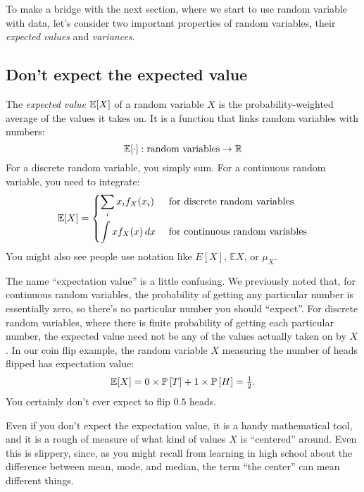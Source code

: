 To make a bridge with the next section, where we start to use random variable
with data, let's consider two important properties of random variables, their
\emph{expected values} and \emph{variances}.

\subsection{Don't expect the expected value}

The \emph{expected value} $\mathbb{E}\!\left[{X}\right]$ of a random variable $X$ is the
probability-weighted average of the values it takes on. It is a function that
links random variables with numbers:
\begin{equation*}
\mathbb{E}\!\left[{\cdot}\right] : \text{random variables} \to \mathbb{R}
\end{equation*}
For a discrete random variable, you simply sum. For a continuous random
variable, you need to integrate:
\begin{equation}
\mathbb{E}\!\left[{X}\right] = \begin{dcases}
  \sum_i x_i f_X(x_i) & \text{ for discrete random variables} \\
  \int x f_X(x) \,dx & \text{ for continuous random variables}
\end{dcases}
\end{equation}
You might also see people use notation like $E[X]$, $\mathbb{E}X$, or $\mu_X$.


The name ``expectation value'' is a little confusing. We previously noted that,
for continuous random variables, the probability of getting any particular
number is essentially zero, so there's no particular number you should
``expect''. For discrete random variables, where there is finite probability
of getting each particular number, the expected value need not be any of the
values actually taken on by $X$. In our coin flip example, the random variable
$X$ measuring the number of heads flipped has expectation value:
\begin{equation}
\mathbb{E}\!\left[{X}\right] = 0 \times \mathbb{P}\left[{T}\right] + 1 \times \mathbb{P}\left[{H}\right] = \tfrac{1}{2}.
\end{equation}
You certainly don't ever expect to flip $0.5$ heads.

Even if you don't expect the expectation value, it is a handy mathematical
tool, and it is a rough of measure of what kind of values $X$ is ``centered''
around. Even this is slippery, since, as you might recall from learning in
high school about the difference between mean, mode, and median, the term ``the
center'' can mean different things.

